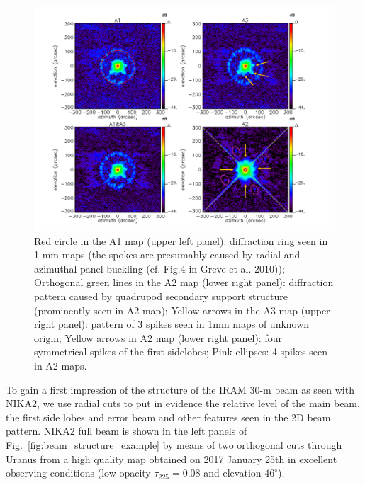 \begin{figure}[ht!]
\begin{center}
  \includegraphics[clip, angle=0, scale=0.4]{Figures/Beams_features.pdf}
\caption[Noticeable features of NIKA2 beam pattern.]{ Red circle in the
  A1 map (upper left panel): diffraction ring seen in 1-mm maps
  (the spokes are presumably caused by radial and azimuthal panel buckling (cf. Fig.4 in Greve et
  al. 2010)); Orthogonal green lines in the A2 map (lower right panel): diffraction
  pattern caused by quadrupod secondary support structure (prominently
  seen in A2 map); Yellow arrows in the A3 map (upper right panel):
  pattern of 3 spikes seen in 1mm maps of unknown origin; Yellow
  arrows in A2 map (lower right panel): four symmetrical spikes of the
  first sidelobes; Pink ellipses: 4 spikes seen in A2 maps.}
\label{fig:features}
\end{center}
\end{figure}


To gain a first impression of the structure of the IRAM 30-m beam as
seen with NIKA2, we use radial cuts to put in evidence the relative level of
the main beam, the first side lobes and error beam and other features seen in the 2D
beam pattern. NIKA2 full beam is shown in the left
panels of Fig.~\ref{fig:beam_structure_example} by means of two
orthogonal cuts through Uranus from a high quality map obtained on
2017 January 25th in excellent observing conditions
(low opacity $\tau_{225}=0.08$ and elevation $46^{\circ}$).


